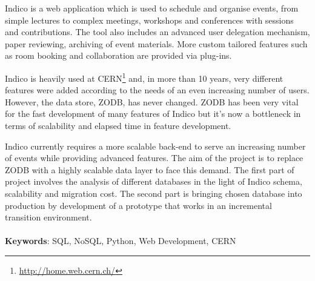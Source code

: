 \begin{abstracts}

\par Indico is a web application which is used to schedule and organise events, from simple lectures to complex meetings, workshops and conferences with sessions and contributions. The tool also includes an advanced user delegation mechanism, paper reviewing, archiving of event materials. More custom tailored features such as room booking and collaboration are provided via plug-ins.
\\
\par Indico is heavily used at \textsc{CERN}\footnote{\url{http://home.web.cern.ch/}} and, in more than 10 years, very different features were added according to the needs of an even increasing number of users. However, the data store, \textsc{ZODB}, has never changed. \textsc{ZODB} has been very vital for the fast development of many features of Indico but it's now a bottleneck in terms of scalability and elapsed time in feature development.
\\
\par Indico currently requires a more scalable back-end to serve an increasing number of events while providing advanced features. The aim of the project is to replace \textsc{ZODB} with a highly scalable data layer to face this demand. The first part of project involves the analysis of different databases in the light of Indico schema, scalability and migration cost. The second part is bringing chosen database into production by development of a prototype that works in an incremental transition environment.
\\
\\
\textbf{Keywords}: SQL, NoSQL, Python, Web Development, CERN

\end{abstracts}
